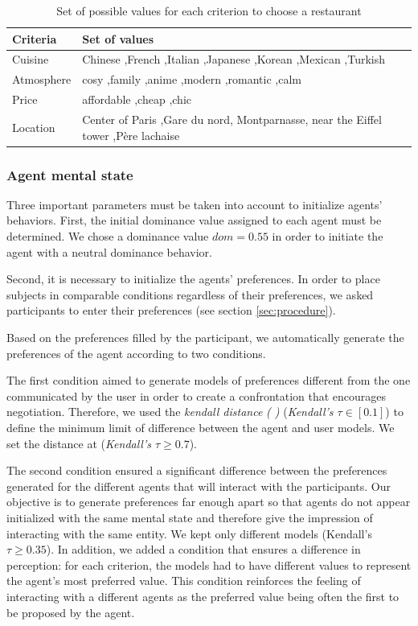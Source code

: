 \documentclass[10pt, a4paper, twocolumn]{article} %
\begin{document}
	\begin{table}[h]
		\caption{Set of possible values for each criterion to choose a restaurant}
		\label{tab:valuesCriteria}
			\centering
			\begin{tabular}{p{1.6cm}| p{5.5cm}}
				\hline
				\hline
				\textbf{Criteria} & \textbf{Set of values} \\
				\hline
				Cuisine & Chinese ,French ,Italian ,Japanese ,Korean ,Mexican ,Turkish \\
				\hline
				Atmosphere & cosy ,family ,anime ,modern ,romantic ,calm \\
				\hline 
				Price & affordable ,cheap ,chic \\
				\hline
				Location & Center of Paris ,Gare du nord, Montparnasse, near the Eiffel tower ,Père lachaise \\
				\hline
				\hline
				\end{tabular}
			\end{table}
	
	\subsubsection{Agent mental state}		
		Three important parameters must be taken into account to initialize agents' behaviors. 
		First, the initial dominance value assigned to each agent must be determined. We chose a dominance value $dom =0.55$ in order to initiate the agent with a neutral dominance behavior.
	
		Second, it is necessary to initialize the agents' preferences. In order to place subjects in comparable conditions regardless of their preferences, we asked participants to enter their preferences (see section \ref{sec:procedure}).
	
		Based on the preferences filled by the participant, we automatically generate the preferences of the agent  according to two conditions.
	
		The first condition aimed to generate models of preferences different from the one communicated by the user in order to create a confrontation that encourages negotiation. Therefore, we used the \textit{kendall distance} \emph{(\cite{bra2013Kendall} )} (\emph{Kendall's $ \tau \in[0.1]$}) to define the minimum limit of difference between the agent and user models. We set the distance at (\emph{Kendall's $ \tau \geq 0.7$}).
	
		The second condition ensured a significant difference between the preferences generated for the different agents that will interact with the participants. 
		Our objective is to generate preferences far enough apart so that agents do not appear initialized with the same mental state and therefore give the impression of interacting with the same entity. We kept only different models (Kendall's $ \tau \geq 0.35$). In addition, we added a condition that ensures a difference in perception: for each criterion, the models had to have different values to represent the agent's most preferred value. 
		This condition reinforces the feeling of interacting with a different agents as the preferred value being often the first to be proposed by the agent. 
		
\end{document}
